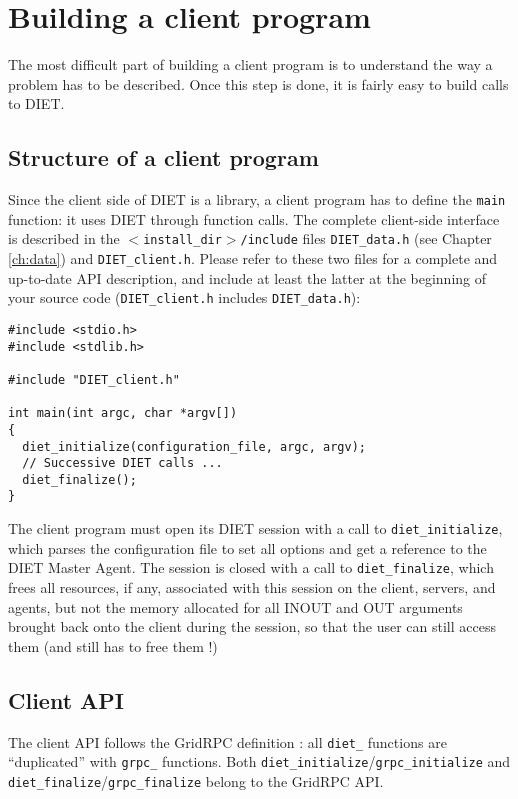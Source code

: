 \chapter{Building a client program}
\label{ch:client}

The most difficult part of building a client program is to understand the way a
problem has to be described. Once this step is done, it is fairly easy to
build calls to DIET.


\section{Structure of a client program}
\label{sec:cl_struct}

Since the client side of DIET is a library, a client program has to define the
\texttt{main} function: it uses DIET through function calls. The complete
client-side interface is described in the \texttt{$<$install\_dir$>$/include}
files \texttt{DIET\_data.h} (see Chapter \ref{ch:data}) and
\texttt{DIET\_client.h}. Please refer to these two files for a complete and
up-to-date API description, and include at least the latter at the beginning of
your source code (\texttt{DIET\_client.h} includes \texttt{DIET\_data.h}):
{\footnotesize
\begin{verbatim}
#include <stdio.h>
#include <stdlib.h>

#include "DIET_client.h"

int main(int argc, char *argv[])
{
  diet_initialize(configuration_file, argc, argv);
  // Successive DIET calls ...
  diet_finalize();
}
\end{verbatim}
}

The client program must open its DIET session with a call to
\texttt{diet\_initialize}, which parses the configuration file to set
all options and get a reference to the DIET Master Agent. The session
is closed with a call to \texttt{diet\_finalize}, which frees all
resources, if any, associated with this session on the client, servers,
and agents, but not the memory allocated for all INOUT and OUT
arguments brought back onto the client during the session, so that the
user can still access them (and still has to free them !)


\section{Client API}
\label{sec:clAPI}

The client API follows the GridRPC definition \cite{gridRPC:02}: all
\texttt{diet\_} functions are ``duplicated'' with \texttt{grpc\_}
functions.  Both \texttt{diet\_initialize}/\texttt{grpc\_initialize}
and \texttt{diet\_finalize}/\texttt{grpc\_finalize} belong to the
GridRPC API. 
 
